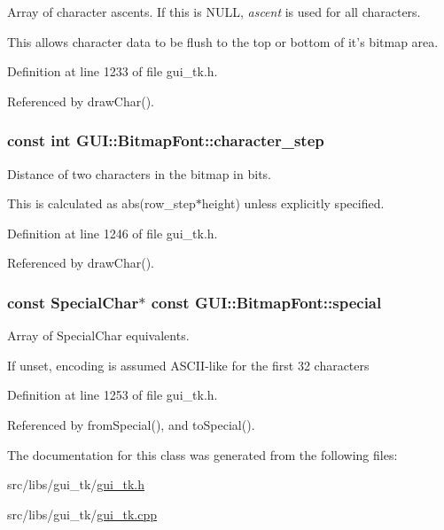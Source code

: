 Array of character ascents. If this is N\-U\-L\-L, {\itshape ascent\/} is used for all characters. 

This allows character data to be flush to the top or bottom of it's bitmap area. 

Definition at line 1233 of file gui\-\_\-tk.\-h.



Referenced by draw\-Char().

\hypertarget{classGUI_1_1BitmapFont_a27146558fd76b2ac1c2dc7133b23f4ce}{
\subsubsection[{character\-\_\-step}]{\setlength{\rightskip}{0pt plus 5cm}const int {\bf G\-U\-I\-::\-Bitmap\-Font\-::character\-\_\-step}}}\label{classGUI_1_1BitmapFont_a27146558fd76b2ac1c2dc7133b23f4ce}


Distance of two characters in the bitmap in bits. 

This is calculated as abs(row\-\_\-step$\ast$height) unless explicitly specified. 

Definition at line 1246 of file gui\-\_\-tk.\-h.



Referenced by draw\-Char().

\hypertarget{classGUI_1_1BitmapFont_a46f912c496e902dfc614e25261599718}{
\subsubsection[{special}]{\setlength{\rightskip}{0pt plus 5cm}const {\bf Special\-Char}$\ast$ const {\bf G\-U\-I\-::\-Bitmap\-Font\-::special}}}\label{classGUI_1_1BitmapFont_a46f912c496e902dfc614e25261599718}


Array of Special\-Char equivalents. 

If unset, encoding is assumed A\-S\-C\-I\-I-\/like for the first 32 characters 

Definition at line 1253 of file gui\-\_\-tk.\-h.



Referenced by from\-Special(), and to\-Special().



The documentation for this class was generated from the following files\-:\begin{DoxyCompactItemize}
\item 
src/libs/gui\-\_\-tk/\hyperlink{gui__tk_8h}{gui\-\_\-tk.\-h}\item 
src/libs/gui\-\_\-tk/\hyperlink{gui__tk_8cpp}{gui\-\_\-tk.\-cpp}\end{DoxyCompactItemize}
